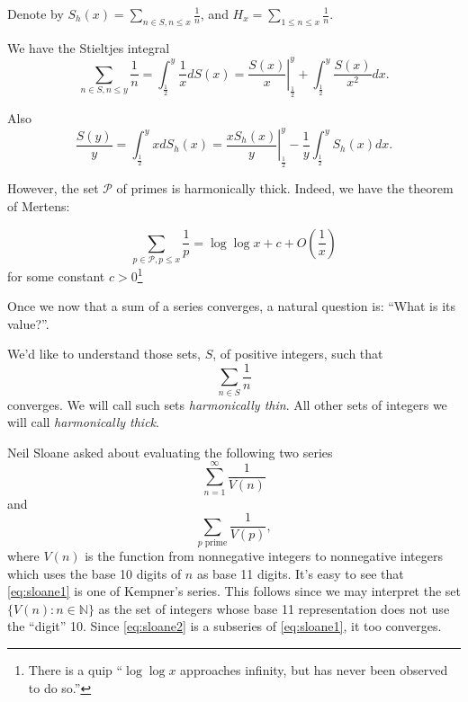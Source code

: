\documentclass{article}
\newcommand{\NN}{\mathbb{N}}
\begin{document}
Denote by $S_h(x) = \sum_{n \in S, n \le x}\frac{1}{n}$, and $H_x =
\sum_{1 \le n \le x} \frac{1}{n}$.

We have the Stieltjes integral
\begin{displaymath}
  \sum_{n \in S, n \le y} \frac{1}{n} = \int_{\frac{1}{2}}^y \frac{1}{x} d S(x) =
\left.\frac{S(x)}{x} \right|_{\frac{1}{2}}^y + \int_{\frac{1}{2}}^y \frac{S(x)}{x^2} dx.
\end{displaymath}

Also
\begin{displaymath}
  \frac{S(y)}{y} = \int_{\frac{1}{2}}^y x d S_h(x) = \left. \frac{x S_h(x)}{y}
  \right|_{\frac{1}{2}}^y - \frac{1}{y} \int_{\frac{1}{2}}^y S_h(x) dx.
\end{displaymath}

However, the set $\mathcal{P}$ of primes is harmonically
thick. Indeed, we have the theorem of Mertens:

\begin{equation}
\label{eq:mertens}
\sum_{p \in \mathcal{P}, p \le x} \frac{1}{p} = \log \log x + c +
O\left(\frac{1}{x}\right)
\end{equation}
for some constant $c > 0$\footnote{There is a quip ``$\log \log x$
  approaches infinity, but has never been observed to do so.''}

Once we now that a sum of a series converges, a natural question is:
``What is its value?''.

We'd like to understand those sets, $S$, of positive integers, such
that
\begin{equation}
  \label{eq:thin}
  \sum_{n \in S} \frac{1}{n}
\end{equation}
converges. We will call such sets \emph{harmonically thin}. All other
sets of integers we will call \emph{harmonically thick}. 

Neil Sloane asked about evaluating the following two series
\begin{equation}
  \label{eq:sloane1}
  \sum_{n=1}^\infty \frac{1}{V(n)}
\end{equation}
and
\begin{equation}
  \label{eq:sloane2}
  \sum_{p \text{ prime}} \frac{1}{V(p)},
\end{equation}
where $V(n)$ is the function from nonnegative integers to
nonnegative integers which uses the base 10 digits of $n$ as base 11
digits. It's easy to see that \eqref{eq:sloane1} is one of Kempner's
series.  This follows since we may interpret the set
$\{V(n) : n \in \NN\}$ as the set of integers whose base 11
representation does not use the ``digit'' 10.  Since
\eqref{eq:sloane2} is a subseries of \eqref{eq:sloane1}, it too
converges.
\end{document}
